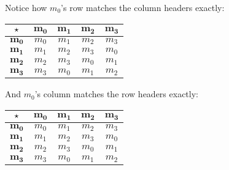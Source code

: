 \documentclass[../../../main.tex]{subfiles}
\begin{document}
\begin{fexample}
\begin{aside}
  \begin{remark}
  
Notice how $m_{0}$'s row matches the column headers exactly:

\begin{center}
  \begin{tabular}{| c || c | c | c | c |}
    \hline
    $\opSymbol/$ & \cellcolor{grey3} $\mathbf{m_{0}}$ & \cellcolor{grey3} $\mathbf{m_{1}}$ & \cellcolor{grey3} $\mathbf{m_{2}}$ & \cellcolor{grey3} $\mathbf{m_{3}}$ \\ \hline \hline
    $\mathbf{m_{0}}$      & \cellcolor{grey3}$m_{0}$ & \cellcolor{grey3}$m_{1}$ & \cellcolor{grey3} $m_{2}$ & \cellcolor{grey3} $m_{3}$ \\ \hline
    $\mathbf{m_{1}}$      & $m_{1}$ & $m_{2}$ & $m_{3}$ & $m_{0}$ \\ \hline
    $\mathbf{m_{2}}$      & $m_{2}$ & $m_{3}$ & $m_{0}$ & $m_{1}$ \\ \hline
    $\mathbf{m_{3}}$      & $m_{3}$ & $m_{0}$ & $m_{1}$ & $m_{2}$ \\ \hline
  \end{tabular}
\end{center}

And $m_{0}$'s column matches the row headers exactly:

\begin{center}
  \begin{tabular}{| c || c | c | c | c |}
    \hline
    $\opSymbol/$ & $\mathbf{m_{0}}$ & $\mathbf{m_{1}}$ & $\mathbf{m_{2}}$ & $\mathbf{m_{3}}$ \\ \hline \hline
    \cellcolor{grey3} $\mathbf{m_{0}}$      & \cellcolor{grey3}$m_{0}$ & $m_{1}$ & $m_{2}$ & $m_{3}$ \\ \hline
    \cellcolor{grey3} $\mathbf{m_{1}}$      & \cellcolor{grey3} $m_{1}$ & $m_{2}$ & $m_{3}$ & $m_{0}$ \\ \hline
    \cellcolor{grey3} $\mathbf{m_{2}}$      & \cellcolor{grey3} $m_{2}$ & $m_{3}$ & $m_{0}$ & $m_{1}$ \\ \hline
    \cellcolor{grey3} $\mathbf{m_{3}}$      & \cellcolor{grey3} $m_{3}$ & $m_{0}$ & $m_{1}$ & $m_{2}$ \\ \hline
  \end{tabular}
\end{center}
  
  \end{remark}
\end{aside}


\end{fexample}
\end{document}
